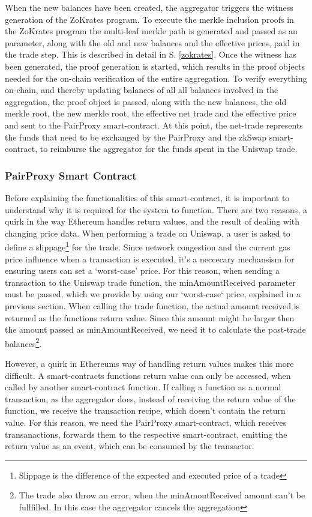 \documentclass[../../thesis.tex]{subfiles}
\begin{document}
When the new balances have been created, the aggregator triggers the witness generation of the ZoKrates program. To execute the merkle inclusion proofs in the ZoKrates program the multi-leaf merkle path is generated and passed as an parameter, along with the old and new balances and the effective prices, paid in the trade step. This is described in detail in S. \ref{zokrates}. Once the witness has been generated, the proof generation is started, which results in the proof objects needed for the on-chain verification of the entire aggregation. To verify everything on-chain, and thereby updating balances of all all balances involved in the aggregation, the proof object is passed, along with the new balances, the old merkle root, the new merkle root, the effective net trade and the effective price and sent to the PairProxy smart-contract. At this point, the net-trade represents the funds that need to be exchanged by the PairProxy and the zkSwap smart-contract, to reimburse the aggregator for the funds spent in the Uniswap trade. 

\subsubsection{PairProxy Smart Contract} \label{pairProxy}
Before explaining the functionalities of this smart-contract, it is important to understand why it is required for the system to function. There are two reasons, a quirk in the way Ethereum handles return values, and the result of dealing with changing price data.
When performing a trade on Uniswap, a user is asked to define a slippage\footnote{Slippage is the difference of the expected and executed price of a trade} for the trade. Since network congestion and the current gas price influence when a transaction is executed, it's a neccecary mechansism for ensuring users can set a `worst-case' price. For this reason, when sending a transaction to the Uniswap trade function, the minAmountReceived parameter must be passed, which we provide by using our `worst-case` price, explained in a previous section. When calling the trade function, the actual amount received is returned as the functions return value. Since this amount might be larger then the amount passed as minAmountReceived, we need it to calculate the post-trade balances\footnote{The trade also throw an error, when the minAmoutReceived amount can't be fullfilled. In this case the aggregator cancels the aggregation}. 

However, a quirk in Ethereums way of handling return values makes this more difficult. A smart-contracts functions return value can only be accessed, when called by another smart-contract function. If calling a function as a normal transaction, as the aggregator does, instead of receiving the return value of the function, we receive the transaction recipe, which doesn't contain the return value. For this reason, we need the PairProxy smart-contract, which receives transanactions, forwards them to the respective smart-contract, emitting the return value as an event, which can be consumed by the transactor. 
\end{document}
